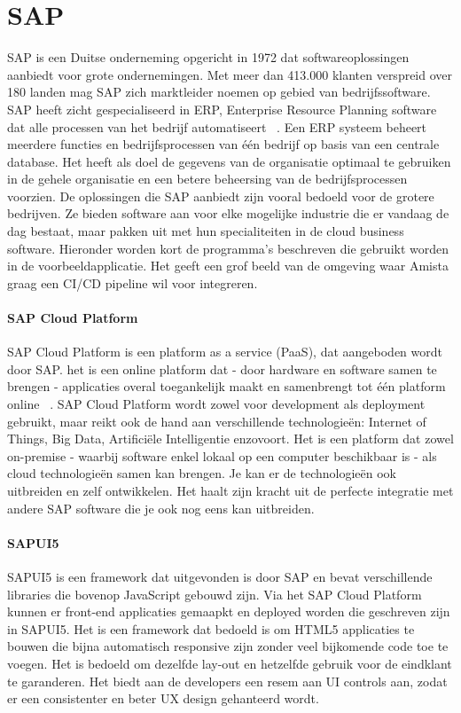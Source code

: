 \section{SAP}
\label{sec:sap}
    SAP is een Duitse onderneming opgericht in 1972 dat softwareoplossingen aanbiedt voor grote ondernemingen. Met meer dan 413.000 klanten verspreid over 180 landen mag SAP zich marktleider noemen op gebied van bedrijfssoftware.
    SAP heeft zicht gespecialiseerd in ERP, Enterprise Resource Planning software dat alle processen van het bedrijf automatiseert ~\autocite{SAPERP2019}. Een ERP systeem beheert meerdere functies en bedrijfsprocessen van één bedrijf op basis van een centrale database. Het heeft als doel de gegevens van de organisatie optimaal te gebruiken in de gehele organisatie en een betere beheersing van de bedrijfsprocessen voorzien.
    De oplossingen die SAP aanbiedt zijn vooral bedoeld voor de grotere bedrijven. Ze bieden software aan voor elke mogelijke industrie die er vandaag de dag bestaat, maar pakken uit met hun specialiteiten in de cloud business software.
    Hieronder worden kort de programma's beschreven die gebruikt worden in de voorbeeldapplicatie. Het geeft een grof beeld van de omgeving waar Amista graag een CI/CD pipeline wil voor integreren.
     
    \paragraph{SAP Cloud Platform}
    SAP Cloud Platform is een platform as a service (PaaS), dat aangeboden wordt door SAP. het is een online platform dat - door hardware en software samen te brengen - applicaties overal toegankelijk maakt en samenbrengt tot één platform online ~\autocite{SAPSE2018}.
    SAP Cloud Platform wordt zowel voor development als deployment gebruikt, maar reikt ook de hand aan verschillende technologieën: Internet of Things, Big Data, Artificiële Intelligentie enzovoort. Het is een platform dat zowel on-premise - waarbij software enkel lokaal op een computer beschikbaar is - als cloud technologieën samen kan brengen. Je kan er de technologieën ook uitbreiden en zelf ontwikkelen. Het haalt zijn kracht uit de perfecte integratie met andere SAP software die je ook nog eens kan uitbreiden.
    
    \paragraph{SAPUI5}
    SAPUI5 is een framework dat uitgevonden is door SAP en bevat verschillende libraries die bovenop JavaScript gebouwd zijn. Via het SAP Cloud Platform kunnen er front-end applicaties gemaapkt en deployed worden die geschreven zijn in SAPUI5. Het is een framework dat bedoeld is om HTML5 applicaties te bouwen die bijna automatisch responsive zijn zonder veel bijkomende code toe te voegen.
    Het is bedoeld om dezelfde lay-out en hetzelfde gebruik voor de eindklant te garanderen. Het biedt aan de developers een resem aan UI controls aan, zodat er een consistenter en beter UX design gehanteerd wordt.~\autocite{SAPSEa} 
    
